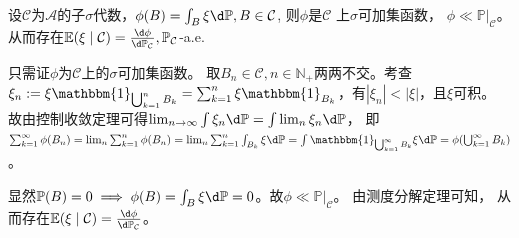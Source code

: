 \documentclass{ctexart}
\newcommand{\res}[2]{#1 |_{#2}}
\newif\ifpreface
\begin{document}
\large
\setlength{\baselineskip}{1.2em}
\ifpreface

\newgeometry{left=2cm,right=2cm,top=2cm,bottom=2cm}
\else
{}
\maketitle
\fi
\begin{problem}\label{pro:2}
  设\(\mathcal{C} \)为\(\mathcal{A} \)的子\(\sigma \)代数，\(\phi(B)=\int_{B} \xi \d \mathbb{P} , B \in \mathcal{C}  \), 则\(\phi  \)是\( \mathcal{C} \) 上\(\sigma \)可加集函数，
  \(\phi \ll \res{\mathbb{P}}{\mathcal{C}}\)。从而存在\(\mathbb{E}(\xi \mid \mathcal{C}) = \frac{\d \phi}{\d \mathbb{P}_{\mathcal{C}}}, \mathbb{P}_{\mathcal{C}}\)-a.e.
\end{problem}
\begin{solution}
  只需证\(\phi \)为\(\mathcal{C} \)上的\(\sigma \)可加集函数。
  取\(B_n \in \mathcal{C},n \in \mathbb{N}_{+} \)两两不交。考查\(\xi_n:=\xi \mathbbm{1}_{\bigcup_{k=1}^{n}B_k} = \sum_{k=1}^{n} \xi \mathbbm{1}_{B_k} \)，有\(|\xi_n|<|\xi| \)，且\(\xi \)可积。
  故由控制收敛定理可得\(\lim_{n \to \infty} \int \xi_n \d \mathbb{P} = \int \lim_{n} \xi_n \d \mathbb{P} \)，
  即\(\sum_{k=1}^{\infty} \phi(B_n)=\lim_{n}\sum_{k=1}^{n} \phi(B_n) = \lim_{n} \sum_{k=1}^{n} \int_{B_k} \xi \d \mathbb{P} = \int \mathbbm{1}_{\bigcup_{k=1}^{\infty} B_k} \xi \d \mathbb{P} = \phi(\bigcup_{k=1}^{\infty} B_k) \)。

  显然\(\mathbb{P}(B)=0 \implies \phi(B)=\int_{B} \xi \d \mathbb{P} =0\)。故\(\phi \ll \res{\mathbb{P}}{\mathcal{C}} \)。
  由测度分解定理可知，
  从而存在\(\mathbb{E}(\xi \mid \mathcal{C}) = \frac{\d \phi}{ \d \mathbb{P}_{\mathcal{C}}} \)。
\end{solution}
\end{document}

